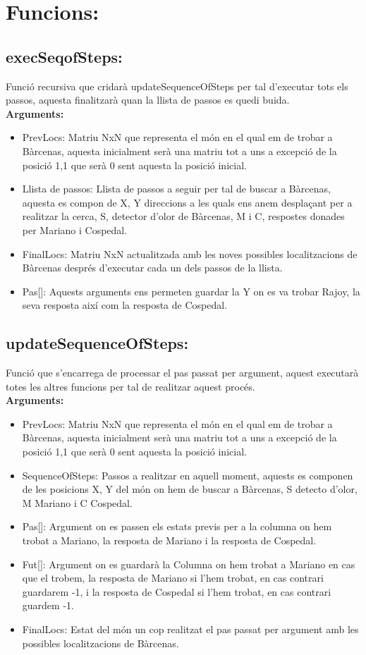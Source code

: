 \documentclass[11pt]{article}
\begin{document}
\section{Funcions:}
\subsection{execSeqofSteps:}
Funció recursiva que cridarà updateSequenceOfSteps per tal d'executar tots els passos, aquesta finalitzarà quan la llista de passos es quedi buida.\\
\textbf{Arguments:}
\begin{itemize}
\item PrevLocs: Matriu NxN que representa el món en el qual em de trobar a Bàrcenas, aquesta inicialment serà una matriu tot a uns a excepció de la posició 1,1 que serà 0 sent aquesta la posició inicial.
\item Llista de passos: Llista de passos a seguir per tal de buscar a Bàrcenas, aquesta es compon de X, Y direccions a les quals ens anem desplaçant per a realitzar la cerca, S, detector d'olor de Bàrcenas, M i C, respostes donades per Mariano i Cospedal.
\item FinalLocs: Matriu NxN actualitzada amb les noves possibles localitzacions de Bàrcenas després d'executar cada un dels passos de la llista.
\item Pas[]: Aquests arguments ens permeten guardar la Y on es va trobar Rajoy, la seva resposta així com la resposta de Cospedal.
\end{itemize}
\newpage
\subsection{updateSequenceOfSteps:}
Funció que s'encarrega de processar el pas passat per argument, aquest executarà totes les altres funcions per tal de realitzar aquest procés.\\
\textbf{Arguments:}
\begin{itemize}
\item PrevLocs: Matriu NxN que representa el món en el qual em de trobar a Bàrcenas, aquesta inicialment serà una matriu tot a uns a excepció de la posició 1,1 que serà 0 sent aquesta la posició inicial.
\item SequenceOfSteps: Passos a realitzar en aquell moment, aquests es componen de les posicions X, Y del món on hem de buscar a Bàrcenas, S detecto d'olor, M Mariano i C Cospedal.
\item Pas[]: Argument on es passen els estats previs per a la columna on hem trobat a Mariano, la resposta de Mariano i la resposta de Cospedal.
\item Fut[]: Argument on es guardarà la Columna on hem trobat a Mariano en cas que el trobem, la resposta de Mariano si l'hem trobat, en cas contrari guardarem -1, i la resposta de Cospedal si l'hem trobat, en cas contrari guardem -1.
\item FinalLocs: Estat del món un cop realitzat el pas passat per argument amb les possibles localitzacions de Bàrcenas.
\end{itemize}
\end{document}
